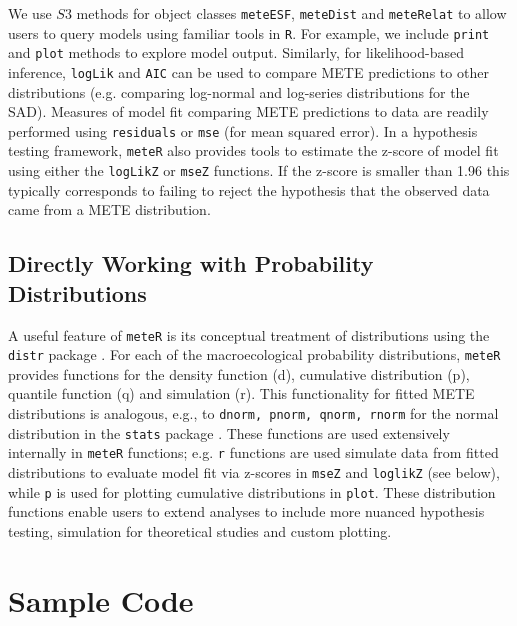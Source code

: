 We use $S3$ methods for object classes \texttt{meteESF}, \texttt{meteDist}
and \texttt{meteRelat} to allow users to query models using familiar
tools in \texttt{R}. For example, we include \texttt{print} and \texttt{plot}
methods to explore model output. Similarly, for likelihood-based
inference, \texttt{logLik} and \texttt{AIC} can be used to compare METE
predictions to other distributions (e.g. comparing log-normal and
log-series distributions for the SAD). Measures of model fit comparing
METE predictions to data are readily performed using \texttt{residuals}
or \texttt{mse} (for mean squared error). In a hypothesis testing
framework, \texttt{meteR} also provides tools to estimate the z-score of
model fit using either the \texttt{logLikZ} or \texttt{mseZ} functions. If
the z-score is smaller than 1.96 this typically corresponds to failing
to reject the hypothesis that the observed data came from a METE
distribution.


\subsection{Directly Working with Probability Distributions}

A useful feature of \texttt{meteR} is its conceptual treatment of
distributions using the \texttt{distr} package
\citep{Ruckdeschel:2006vn}. For each of the macroecological
probability distributions, \texttt{meteR} provides functions for the
density function (d), cumulative distribution (p), quantile function
(q) and simulation (r). This functionality for fitted METE
distributions is analogous, e.g., to \texttt{dnorm, pnorm, qnorm, rnorm}
for the normal distribution in the \texttt{stats} package
\citep{RDevelopmentCoreTeam2013}. These functions are used extensively
internally in \texttt{meteR} functions; e.g. \texttt{r} functions are used
simulate data from fitted distributions to evaluate model fit via
z-scores in \texttt{mseZ} and \texttt{loglikZ} (see below), while \texttt{p} is
used for plotting cumulative distributions in \texttt{plot}. These
distribution functions enable users to extend analyses to include more
nuanced hypothesis testing, simulation for theoretical studies and
custom plotting.


\section{Sample Code}

